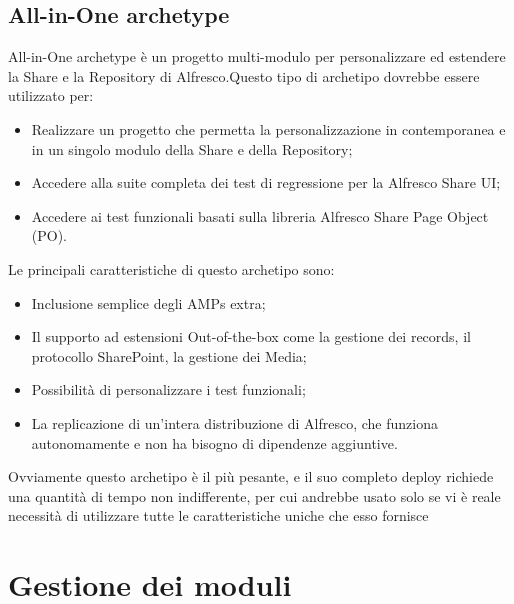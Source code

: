 \subsection{All-in-One archetype}
All-in-One archetype è un progetto multi-modulo per personalizzare ed estendere la
Share e la Repository di Alfresco.Questo tipo di archetipo dovrebbe essere utilizzato per:
\begin{itemize}
\item Realizzare un progetto che permetta la personalizzazione in contemporanea e in un singolo modulo della Share e della
Repository;
\item Accedere alla suite completa dei test di regressione per la Alfresco Share UI;
\item Accedere ai test funzionali basati sulla libreria Alfresco Share Page Object (PO).
\end{itemize}
Le principali caratteristiche di questo archetipo sono:
\begin{itemize}
\item Inclusione semplice degli AMPs extra;
\item Il supporto ad estensioni Out-of-the-box come la gestione dei records, il protocollo SharePoint, la
gestione dei Media;
\item Possibilità di personalizzare i test funzionali;
\item La replicazione di un'intera distribuzione di Alfresco, che funziona autonomamente e non ha bisogno di dipendenze aggiuntive.
\end{itemize}
Ovviamente questo archetipo è il più pesante, e il suo completo deploy richiede una quantità di tempo non indifferente, per cui andrebbe usato solo se vi è reale necessità di utilizzare tutte le caratteristiche uniche che esso fornisce
\section{Gestione dei moduli}
